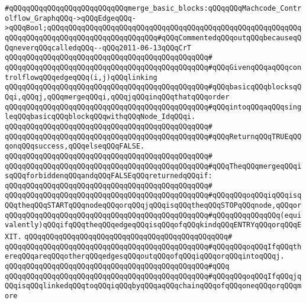 \verb|#qQQqqQQqqQQqqQQqqQQqqQQqqQQqmerge_basic_blocks:qQQqqQQqMachcode_Controlflow_GraphqQQq->qQQqEdgeqQQq->qQQqBool;qQQqqQQqqQQqqQQqqQQqqQQqqQQqqQQqqQQqqQQqqQQqqQQqqQQqqQQqqQQqqQQqqQQqqQQqqQQqqQQqqQQqqQQqqQQqqQQq#qQQqCommentedqQQqoutqQQqbecauseqQQqneverqQQqcalledqQQq--qQQq2011-06-13qQQqCrT|\newline
\verb|qQQqqQQqqQQqqQQqqQQqqQQqqQQqqQQqqQQqqQQqqQQqqQQq#|\newline
\verb|qQQqqQQqqQQqqQQqqQQqqQQqqQQqqQQqqQQqqQQqqQQqqQQq#qQQqGivenqQQqaqQQqcontrolflowqQQqedgeqQQq(i,j)qQQqlinking|\newline
\verb|qQQqqQQqqQQqqQQqqQQqqQQqqQQqqQQqqQQqqQQqqQQqqQQq#qQQqbasicqQQqblocksqQQqi,qQQqj,qQQqmergeqQQqi,qQQqjqQQqinqQQqthatqQQqorder|\newline
\verb|qQQqqQQqqQQqqQQqqQQqqQQqqQQqqQQqqQQqqQQqqQQqqQQq#qQQqintoqQQqaqQQqsingleqQQqbasicqQQqblockqQQqwithqQQqNode_IdqQQqi.|\newline
\verb|qQQqqQQqqQQqqQQqqQQqqQQqqQQqqQQqqQQqqQQqqQQqqQQq#|\newline
\verb|qQQqqQQqqQQqqQQqqQQqqQQqqQQqqQQqqQQqqQQqqQQqqQQq#qQQqReturnqQQqTRUEqQQqonqQQqsuccess,qQQqelseqQQqFALSE.|\newline
\verb|qQQqqQQqqQQqqQQqqQQqqQQqqQQqqQQqqQQqqQQqqQQqqQQq#|\newline
\verb|qQQqqQQqqQQqqQQqqQQqqQQqqQQqqQQqqQQqqQQqqQQqqQQq#qQQqTheqQQqmergeqQQqisqQQqforbiddenqQQqandqQQqFALSEqQQqreturnedqQQqif:|\newline
\verb|qQQqqQQqqQQqqQQqqQQqqQQqqQQqqQQqqQQqqQQqqQQqqQQq#|\newline
\verb|qQQqqQQqqQQqqQQqqQQqqQQqqQQqqQQqqQQqqQQqqQQqqQQq#qQQqqQQqoqQQqiqQQqisqQQqtheqQQqSTARTqQQqnodeqQQqorqQQqjqQQqisqQQqtheqQQqSTOPqQQqnode,qQQqor|\newline
\verb|qQQqqQQqqQQqqQQqqQQqqQQqqQQqqQQqqQQqqQQqqQQqqQQq#qQQqqQQqqQQqqQQq(equivalently)qQQqifqQQqtheqQQqedgeqQQqisqQQqofqQQqkindqQQqENTRYqQQqorqQQqEXIT.|\newline
\verb|qQQqqQQqqQQqqQQqqQQqqQQqqQQqqQQqqQQqqQQqqQQqqQQq#|\newline
\verb|qQQqqQQqqQQqqQQqqQQqqQQqqQQqqQQqqQQqqQQqqQQqqQQq#qQQqqQQqoqQQqIfqQQqthereqQQqareqQQqotherqQQqedgesqQQqoutqQQqofqQQqiqQQqorqQQqintoqQQqj.|\newline
\verb|qQQqqQQqqQQqqQQqqQQqqQQqqQQqqQQqqQQqqQQqqQQqqQQq#qQQq|\newline
\verb|qQQqqQQqqQQqqQQqqQQqqQQqqQQqqQQqqQQqqQQqqQQqqQQq#qQQqqQQqoqQQqIfqQQqjqQQqisqQQqlinkedqQQqtoqQQqiqQQqbyqQQqaqQQqchainqQQqofqQQqoneqQQqorqQQqmore|\newline
